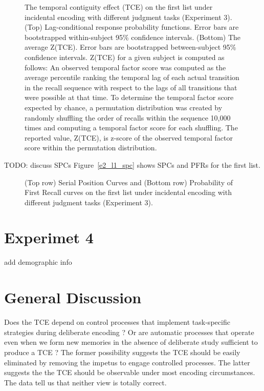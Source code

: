 \documentclass[jou,natbib,floatsintext]{apa6} %
\begin{document}
\begin{figure*}%
\caption{The temporal contiguity effect (TCE) on the first list under incidental encoding with different judgment tasks (Experiment 3). (Top) Lag-conditional response probability functions. Error bars are bootstrapped within-subject 95\% confidence intervals. (Bottom) The average Z(TCE).  Error bars are bootstrapped between-subject 95\% confidence intervals. Z(TCE) for a given subject is computed as follows: An observed temporal factor score was computed as the average percentile ranking the temporal lag of each actual transition in the recall sequence with respect to the lags of all transitions that were possible at that time. To determine the temporal factor score expected by chance, a permutation distribution was created by randomly shuffling the order of recalls within the sequence 10,000 times and computing a temporal factor score for each shuffling. The reported value, Z(TCE), is z-score of the observed temporal factor score within the permutation distribution.}
\label{E3}
\end{figure*}


\color{red}
TODO: discuss SPCs
Figure~\ref{e2_l1_spc} shows SPCs and PFRs for the first list.


\begin{figure*}
\caption{(Top row) Serial Position Curves and (Bottom row) Probability of First Recall curves on the first list under incidental encoding with different judgment tasks (Experiment 3). \spcpaneltext}
\label{e3_l1_spc}
\end{figure*}

\color{black}





\section{Experimet 4}
\label{TODO-8} add demographic info




\section{General Discussion}
Does the TCE depend on control processes that implement task-specific strategies during deliberate encoding \citep{Hint16}? Or are automatic processes that operate even when we form new memories in the absence of deliberate study sufficient to produce a TCE \citep{HealKaha17}? The former possibility suggests the TCE should be easily eliminated by removing the impetus to engage controlled processes. The latter suggests the the TCE should be observable under most encoding circumstances. The data tell us that neither view is totally correct.
\end{document}
